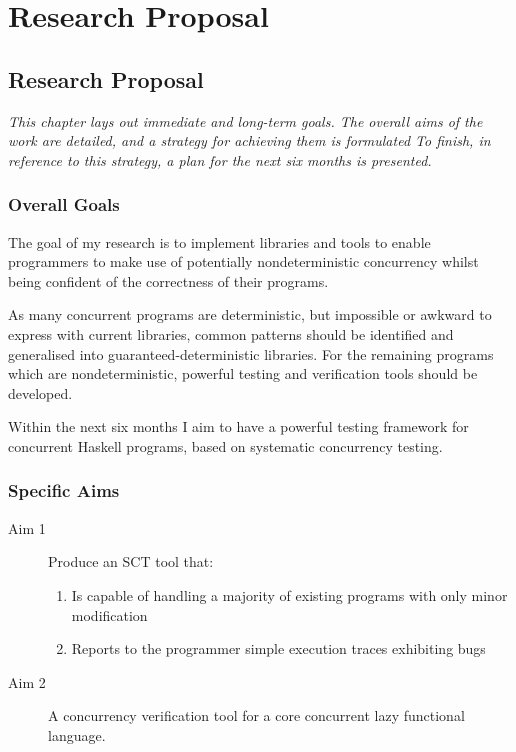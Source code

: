 \part{Research Proposal}


\chapter{Research Proposal}
\label{chp:proposal}

\textit{This chapter lays out immediate and long-term goals. The
  overall aims of the work are detailed, and a strategy for achieving
  them is formulated To finish, in reference to this strategy, a plan
  for the next six months is presented.}

\section{Overall Goals}
\label{sec:proposal-goals}

The goal of my research is to implement libraries and tools to enable
programmers to make use of potentially nondeterministic concurrency
whilst being confident of the correctness of their programs.

As many concurrent programs are deterministic, but impossible or
awkward to express with current libraries, common patterns should be
identified and generalised into guaranteed-deterministic
libraries. For the remaining programs which are nondeterministic,
powerful testing and verification tools should be developed.

Within the next six months I aim to have a powerful testing framework
for concurrent Haskell programs, based on systematic concurrency
testing.

\section{Specific Aims}
\label{sec:proposal-aims}

\begin{description}
  \item[Aim 1] Produce an SCT tool that:
    \begin{enumerate}
      \item Is capable of handling a majority of existing programs with
        only minor modification
      \item Reports to the programmer simple execution traces
        exhibiting bugs
    \end{enumerate}

  \item[Aim 2] A concurrency verification tool for a core concurrent
    lazy functional language.
\end{description}

